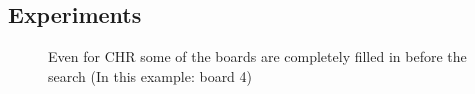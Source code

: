 \documentclass{report}
\begin{document}
\subsection{Experiments}
\label{sub:hashi-exp-2}
	\begin{figure}[h]
        \centering
        \qquad
        \caption{Even for CHR some of the boards are completely filled in before the search (In this example: board 4)}%
    \end{figure}
\end{document}
